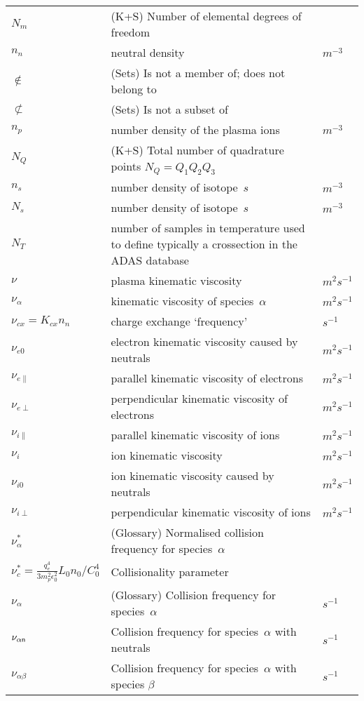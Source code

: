 \begin{longtable}{|p{3.0cm}|p{10.0cm}|p{3.0cm}|}
$N_{m}$ &  (K+S) Number of elemental degrees of freedom & \\
$n_n$ & neutral density & $m^{-3}$ \\
$\notin$ &  (Sets) Is not a member of; does not belong to & \\
$\not\subset$ &  (Sets) Is not a subset of & \\
$n_p$ & number density of the plasma ions & $m^{-3}$ \\
$N_{Q}$ &  (K+S) Total number of quadrature points $N_Q = Q_1 Q_2 Q_3$ & \\
$n_s$ & number density of isotope~$s$ & $m^{-3}$ \\
$N_s$ & number density of isotope~$s$ & $m^{-3}$ \\
$N_T$ & number of samples in temperature used to define typically a crossection in the ADAS database~\cite{adaswebsite,openadaswebsite} & \\
$\nu$ & plasma kinematic viscosity & $m^2 s^{-1}$ \\
$\nu_\alpha$ & kinematic viscosity of species~$\alpha$ & $m^2 s^{-1}$ \\
$\nu_{cx}=K_{cx} n_n$ & charge exchange `frequency'  & $s^{-1}$ \\
$\nu_{e0}$ & electron kinematic viscosity caused by neutrals & $m^2 s^{-1}$ \\
$\nu_{e\|}$ & parallel kinematic viscosity of electrons & $m^2 s^{-1}$ \\
$\nu_{e\perp}$ & perpendicular kinematic viscosity of electrons & $m^2 s^{-1}$ \\
$\nu_{i\|}$ & parallel kinematic viscosity of ions & $m^2 s^{-1}$ \\
$\nu_i$ & ion kinematic viscosity & $m^2 s^{-1}$ \\
$\nu_{i0}$ & ion kinematic viscosity caused by neutrals & $m^2 s^{-1}$ \\
$\nu_{i\perp}$ & perpendicular kinematic viscosity of ions & $m^2 s^{-1}$ \\
$\nu^{*}_\alpha$ & (Glossary) Normalised collision frequency for species~$\alpha$ & \\
$\nu^{*}_c = \frac{q_e^4}{3 m_p^2\epsilon_0^2} L_0 n_0 /C_0^4$ & Collisionality parameter & \\
$\nu_\alpha$ & (Glossary) Collision frequency for species~$\alpha$ & $s^{-1}$ \\
$\nu_{\alpha{\sf n}}$ & Collision frequency for species~$\alpha$ with neutrals & $s^{-1}$ \\
$\nu_{\alpha\beta}$ & Collision frequency for species~$\alpha$ with species $\beta$ & $s^{-1}$ \\

\end{longtable}
